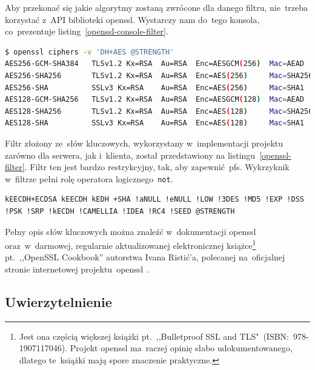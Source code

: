 \documentclass[thesis]{subfiles}
\begin{document}
Aby przekonać się jakie algorytmy zostaną zwrócone dla danego filtru, nie~trzeba korzystać z~API biblioteki \gls{openssl}. Wystarczy nam do~tego konsola, co~prezentuje listing~\ref{openssl-console-filter}.\\

\begin{lstlisting}[numbers=none,language=bash,caption={Wynik filtrowania zestawów algorytmów w~konsoli za~pomocą \gls{openssl}},label=openssl-console-filter]
$ openssl ciphers -v 'DH+AES @STRENGTH'
AES256-GCM-SHA384   TLSv1.2 Kx=RSA  Au=RSA  Enc=AESGCM(256)  Mac=AEAD
AES256-SHA256       TLSv1.2 Kx=RSA  Au=RSA  Enc=AES(256)     Mac=SHA256
AES256-SHA          SSLv3 Kx=RSA    Au=RSA  Enc=AES(256)     Mac=SHA1
AES128-GCM-SHA256   TLSv1.2 Kx=RSA  Au=RSA  Enc=AESGCM(128)  Mac=AEAD
AES128-SHA256       TLSv1.2 Kx=RSA  Au=RSA  Enc=AES(128)     Mac=SHA256
AES128-SHA          SSLv3 Kx=RSA    Au=RSA  Enc=AES(128)     Mac=SHA1
\end{lstlisting}

Filtr złożony ze~słów kluczowych, wykorzystany w~implementacji projektu zarówno dla serwera, jak i~klienta, został przedstawiony na listingu~\ref{openssl-filter}. Filtr ten jest bardzo restrykcyjny, tak, aby zapewnić~\gls{pfs}. Wykrzyknik w~filtrze pełni rolę operatora logicznego~\texttt{not}.\\

\begin{lstlisting}[numbers=none,caption={Filtr \gls{openssl} dla algorytmów użytych w~projekcie},label=openssl-filter]
kEECDH+ECDSA kEECDH kEDH +SHA !aNULL !eNULL !LOW !3DES !MD5 !EXP !DSS !PSK !SRP !kECDH !CAMELLIA !IDEA !RC4 !SEED @STRENGTH
\end{lstlisting}

Pełny opis słów kluczowych można znaleźć w~dokumentacji \gls{openssl} oraz~w~darmowej, regularnie aktualizowanej elektronicznej książce\footnote{Jest ona częścią większej książki pt.~,,Bulletproof SSL and TLS"~(ISBN:~978-1907117046). Projekt \gls{openssl} ma~raczej opinię słabo udokumentowanego, dlatego te~książki mają spore znaczenie praktyczne.} pt.~,,OpenSSL Cookbook'' autorstwa Ivana Ristić'a, polecanej na~oficjalnej stronie internetowej projektu~\gls{openssl}~\cite{openssl-cookbook-suites}.


\subsection{Uwierzytelnienie}
\end{document}
